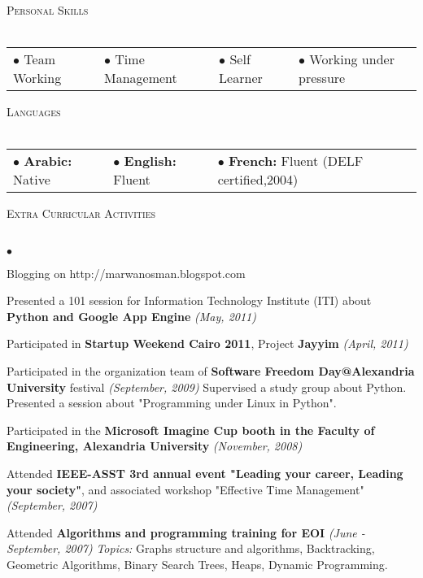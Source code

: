 \documentclass[letterpaper,12pt]{article}
\newcommand{\lineunder}{\vspace*{-8pt} \\ \hspace*{-8pt} \hrulefill \\}
\newcommand{\interval}[1] { \textit{(#1)} }
\newcommand{\header}[1]{{\hspace*{0pt}\vspace*{6pt} \textsc{#1}} \vspace*{-6pt} \lineunder}
\newenvironment{achievements}{\begin{list}{$\bullet$}{\topsep 0pt \itemsep -2pt}}{\vspace*{4pt}\end{list}}
\begin{document}
\newpage

\header{Personal Skills}
\begin{tabular}{l l l l}
$\bullet$ Team Working& 
$\bullet$ Time Management&
$\bullet$ Self Learner& 
$\bullet$ Working under pressure\\
\end{tabular}
\vspace*{4pt}

\header{Languages}
\begin{tabular}{l l l}
$\bullet$ \textbf{Arabic:} Native& 
$\bullet$ \textbf{English:} Fluent&
$\bullet$ \textbf{French:} Fluent (DELF certified,2004)\\
\end{tabular}
\vspace*{4pt}

\header{Extra Curricular Activities}
\begin{achievements}
	\item Blogging on http://marwanosman.blogspot.com
  \item Presented a 101 session for Information Technology Institute (ITI) about \textbf{Python and Google App Engine} \interval{May, 2011}
  \item Participated in \textbf{Startup Weekend Cairo 2011}, Project \textbf{Jayyim} \interval{April, 2011}
  \item Participated in the organization team of \textbf{Software Freedom Day@Alexandria University} festival \interval{September, 2009}
    \subitem Supervised a study group about Python.
    \subitem Presented a session about "Programming under Linux in Python".
  \item Participated in the \textbf{Microsoft Imagine Cup booth in the Faculty of Engineering, Alexandria University} \interval{November, 2008}
  \item Attended \textbf{IEEE-ASST 3rd annual event "Leading your career, Leading your society"}, and associated workshop "Effective Time Management" \interval{September, 2007}
  \item Attended \textbf{Algorithms and programming training for EOI} \interval{June - September, 2007}
    \subitem \textit{Topics:} Graphs structure and algorithms, Backtracking, Geometric Algorithms, Binary Search Trees, Heaps, Dynamic Programming.
\end{achievements}
\end{document}
